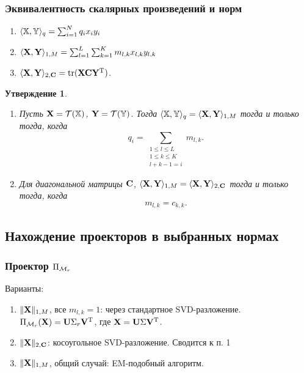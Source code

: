 \documentclass[unicode, notheorems]{beamer}
\newtheorem{proposition}{Утверждение}
\begin{document}
\begin{frame}
	\frametitle{Эквивалентность скалярных произведений и норм}
	\begin{enumerate}
		\item $\langle \mathbb{X}, \mathbb{Y} \rangle_q = \sum_{i=1}^N q_i x_i  y_i$
		\item $\langle\mathbf{X}, \mathbf{Y} \rangle_{1, M} = \sum_{l = 1}^L \sum_{k = 1}^K m_{l, k} x_{l, k} y_{l, k}$
		\item $\langle\mathbf{X}, \mathbf{Y}\rangle_{2, \mathbf{C}} = \text{tr}(\mathbf{X} \mathbf{C} \mathbf{Y}^{\mathrm{T}})$.
	\end{enumerate}
	\begin{proposition}
		\small
	    \begin{enumerate}
		\item Пусть $\mathbf{X} = \mathcal{T}(\mathbb{X})$,  $\mathbf{Y} = \mathcal{T}(\mathbb{Y})$. Тогда $\langle\mathbb{X},\mathbb{Y}\rangle_q= \langle\mathbf{X},\mathbf{Y}\rangle_{1, M}$ тогда и только тогда, когда
		\begin{equation*}
		q_i = \sum_{\substack{1 \le l \le L \\ 1 \le k \le K \\ l+k-1=i}} m_{l,k}.
		\end{equation*}
		
		\item Для диагональной матрицы $\mathbf{C}$, $\langle \mathbf{X},\mathbf{Y} \rangle_{1, M}= \langle \mathbf{X},\mathbf{Y} \rangle_{2, \mathbf{C}}$ тогда и только тогда, когда
		\begin{equation*}
		m_{l,k}=c_{k,k}.
		\end{equation*}
	    \end{enumerate}
	\end{proposition}
	
\end{frame}

\subsection{Нахождение проекторов в выбранных нормах}
\begin{frame}
	\frametitle{Проектор $\Pi_{\mathcal{M}_r}$}
	Варианты:
	\begin{enumerate}
		\item $\|\mathbf{X}\|_{1, M}$, все $m_{l, k} = 1$: через стандартное SVD-разложение. $\Pi_{\mathcal{M}_r}(\mathbf{X}) = \mathbf{U} \Sigma_r \mathbf{V}^{\mathrm{T}}$, где $\mathbf{X} = \mathbf{U} \Sigma \mathbf{V}^{\mathrm{T}}$.
		
		\vspace{0.2cm}
		\item $\|\mathbf{X}\|_{2, \mathbf{C}}$: косоугольное SVD-разложение. Сводится к п. 1
		
		\vspace{0.2cm}
		\item $\|\mathbf{X}\|_{1, M}$, общий случай: EM-подобный алгоритм.

	\end{enumerate}
\end{frame}
\end{document}
